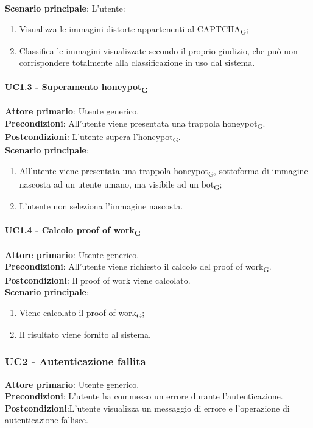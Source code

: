 \textbf{Scenario principale}: L'utente:
\begin{enumerate}
   \item Visualizza le immagini distorte appartenenti al CAPTCHA\textsubscript{G};
   \item Classifica le immagini visualizzate secondo il proprio giudizio, che può non corrispondere totalmente alla classificazione in uso dal sistema.
\end{enumerate}

\paragraph{UC1.3 - Superamento honeypot\textsubscript{G}}
\textbf{Attore primario}: Utente generico.\\
\textbf{Precondizioni}: All'utente viene presentata una trappola honeypot\textsubscript{G}.\\
\textbf{Postcondizioni}: L'utente supera l'honeypot\textsubscript{G}.\\

\textbf{Scenario principale}:
\begin{enumerate}
   \item All'utente viene presentata una trappola honeypot\textsubscript{G}, sottoforma di immagine nascosta ad un utente umano, ma visibile ad un bot\textsubscript{G};
   \item L'utente non seleziona l'immagine nascosta.
\end{enumerate}

\paragraph{UC1.4 - Calcolo proof of work\textsubscript{G}}
\textbf{Attore primario}: Utente generico.\\
\textbf{Precondizioni}: All'utente viene richiesto il calcolo del proof of work\textsubscript{G}.\\
\textbf{Postcondizioni}: Il proof of work viene calcolato.\\

\textbf{Scenario principale}:
\begin{enumerate}
   \item Viene calcolato il proof of work\textsubscript{G};
   \item Il risultato viene fornito al sistema.
\end{enumerate}

\subsubsection{UC2 - Autenticazione fallita}
\textbf{Attore primario}: Utente generico.\\
\textbf{Precondizioni}: L’utente ha commesso un errore durante l'autenticazione.\\
\textbf{Postcondizioni}:L’utente visualizza un messaggio di errore e l’operazione di autenticazione fallisce.\\

